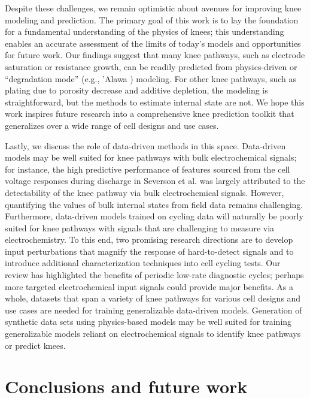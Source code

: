 \documentclass[journal=jpclcd,manuscript=article]{achemso}
\begin{document}
Despite these challenges, we remain optimistic about avenues for improving knee modeling and prediction. The primary goal of this work is to lay the foundation for a fundamental understanding of the physics of knees; this understanding enables an accurate assessment of the limits of today’s models and opportunities for future work. Our findings suggest that many knee pathways, such as electrode saturation or resistance growth, can be readily predicted from physics-driven or ``degradation mode'' (e.g., 'Alawa \cite{dubarry_synthesize_2012, dubarry_big_2020}) modeling. For other knee pathways, such as plating due to porosity decrease and additive depletion, the modeling is straightforward, but the methods to estimate internal state are not. We hope this work inspires future research into a comprehensive knee prediction toolkit that generalizes over a wide range of cell designs and use cases. 

Lastly, we discuss the role of data-driven methods in this space.
Data-driven models may be well suited for knee pathways with bulk electrochemical signals; for instance, the high predictive performance of features sourced from the cell voltage responses during discharge in Severson et al.\cite{severson_data-driven_2019} was largely attributed to the detectability of the knee pathway via bulk electrochemical signals.
However, quantifying the values of bulk internal states from field data remains challenging\cite{aitio_predicting_2021, bian_state--health_2021, sulzer_challenge_2021}.
Furthermore, data-driven models trained on cycling data will naturally be poorly suited for knee pathways with signals that are challenging to measure via electrochemistry.
To this end, two promising research directions are to develop input perturbations that magnify the response of hard-to-detect signals and to introduce additional characterization techniques into cell cycling tests.
Our review has highlighted the benefits of periodic low-rate diagnostic cycles; perhaps more targeted electrochemical input signals could provide major benefits.
As a whole, datasets that span a variety of knee pathways for various cell designs and use cases are needed for training generalizable data-driven models. Generation of synthetic data sets using physics-based models may be well suited for training generalizable models reliant on electrochemical signals to identify knee pathways or predict knees.\cite{dubarry_big_2020, kim_rapid_2021}

\section{Conclusions and future work}
\end{document}
